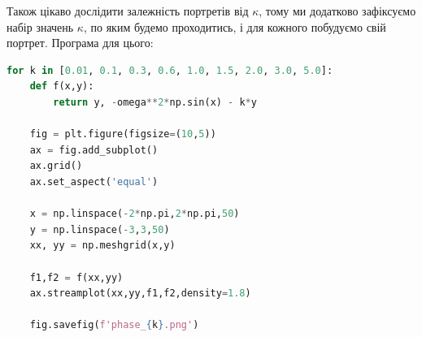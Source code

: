 \documentclass[oneside,solution]{tmpl}
\begin{document}
Також цікаво дослідити залежність портретів від $\kappa$, тому ми додатково зафіксуємо набір значень $\kappa$, по яким будемо проходитись, і для кожного побудуємо свій портрет. Програма для цього:
\begin{lstlisting}[language=Python]
for k in [0.01, 0.1, 0.3, 0.6, 1.0, 1.5, 2.0, 3.0, 5.0]:
    def f(x,y):
        return y, -omega**2*np.sin(x) - k*y
    
    fig = plt.figure(figsize=(10,5))
    ax = fig.add_subplot()
    ax.grid()
    ax.set_aspect('equal')
    
    x = np.linspace(-2*np.pi,2*np.pi,50)  
    y = np.linspace(-3,3,50)  
    xx, yy = np.meshgrid(x,y)
    
    f1,f2 = f(xx,yy)	
    ax.streamplot(xx,yy,f1,f2,density=1.8)
    
    fig.savefig(f'phase_{k}.png')
\end{lstlisting}
\end{document}
